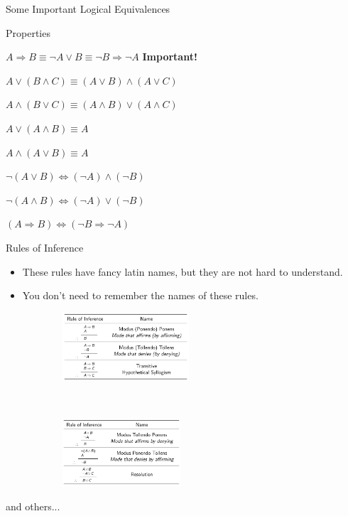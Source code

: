 \begin{frame}{Some Important Logical Equivalences}
    \begin{block}{Properties}
    \begin{description}[Contraposition]
        \item [Implication] $A\Rightarrow B\equiv \neg A\vee B\equiv \neg B\Rightarrow\neg A$ \textbf{ Important!}
        \item [Distributivity] $A\vee(B\wedge C)\equiv (A\vee B)\wedge(A\vee C)$
        \item [] $A\wedge(B\vee C)\equiv (A\wedge B)\vee(A\wedge C)$
        \item [Absorption] $A\vee (A\wedge B)\equiv A$
        \item [] $A\wedge (A\vee B)\equiv A$
        \item [De Morgan's] $\neg(A\vee B)\Leftrightarrow(\neg A)\wedge(\neg B)$
        \item [] $\neg(A\wedge B)\Leftrightarrow(\neg A)\vee(\neg B)$
        \item [Contraposition] $(A\Rightarrow B)\Leftrightarrow (\neg B\Rightarrow \neg A)$
    \end{description}
    \end{block}
\end{frame}

\begin{frame}{Rules of Inference}
    \begin{itemize}
        \item These rules have fancy latin names, but they are not hard to understand.
        \item You don't need to remember the names of these rules.
    \end{itemize}
     
    \begin{figure}
        \centering
        \begin{subfigure}
            \centering
            \includegraphics[height=1in]{../images/syllogism1}
        \end{subfigure}%
        ~ 
        \begin{subfigure}
            \centering
            \includegraphics[height=1in]{../images/syllogism2}
        \end{subfigure}
    \end{figure}

    and others...
\end{frame}

